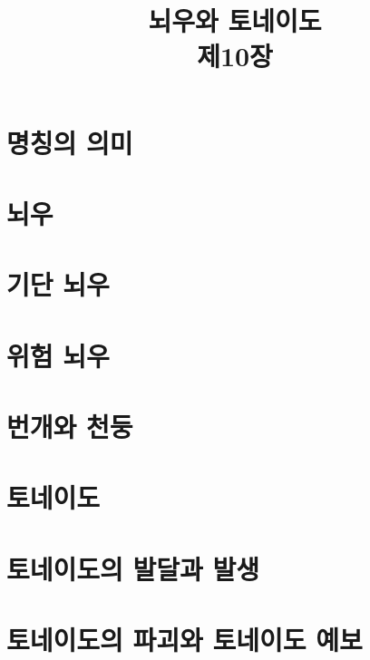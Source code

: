 \title[]{뇌우와 토네이도\\\small{제10장}}

\begin{frame}[plain] %
	\titlepage
\end{frame}


\section{명칭의 의미}


\section{뇌우}

\section{기단 뇌우}

\section{위험 뇌우}

\section{번개와 천둥}

\section{토네이도}

\section{토네이도의 발달과 발생}

\section{토네이도의 파괴와 토네이도 예보}
